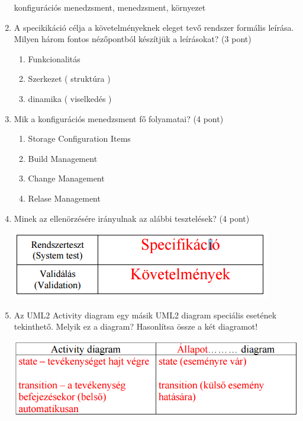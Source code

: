 \begin{enumerate}
		konfigurációs menedzsment, menedzsment, környezet

	\item A specikikáció célja a követelményeknek eleget tevő rendszer formális leírása. Milyen három fontos nézőpontból készítjük a leírásokat? (3 pont)

		\begin{enumerate}
			\item Funkcionalitás
			\item Szerkezet ( struktúra )
			\item dinamika ( viselkedés )
		\end{enumerate}

	\item Mik a konfigurációs menedzsment fő folyamatai? (4 pont)

		\begin{enumerate}
			\item Storage Configuration Items
			\item Build Management
			\item Change Management
			\item Relase Management
		\end{enumerate}

	\item Minek az ellenörzésére irányulnak az alábbi tesztelések? (4 pont)

		\begin{center}
			\includegraphics[scale=0.7]{img/table17}
		\end{center}

	\item Az UML2 Activity diagram egy másik UML2 diagram speciális esetének tekinthető. Melyik ez a diagram? Hasonlítsa össze a két diagramot!

		\begin{center}
			\includegraphics[scale=0.7]{img/table18}
		\end{center}


\end{enumerate}
